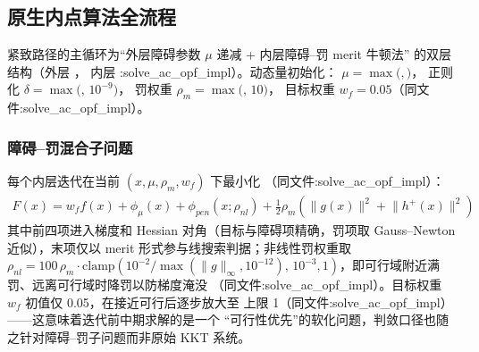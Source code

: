 \subsection{原生内点算法全流程}\label{subsec:acopfnative:algorithm}

紧致路径的主循环为``外层障碍参数 $\mu$ 递减 + 内层障碍--罚 merit 牛顿法''
的双层结构（外层 ，
内层 :solve\_ac\_opf\_impl）。动态量初始化：
$\mu=\max($$,$$)$，
正则化 $\delta=\max($$,\,10^{-9})$，
罚权重 $\rho_{m}=\max($$,\,10)$，
目标权重 $w_f=0.05$（同文件:solve\_ac\_opf\_impl）。

\subsubsection*{障碍--罚混合子问题}
每个内层迭代在当前 $(x,\mu,\rho_m,w_f)$ 下最小化
（同文件:solve\_ac\_opf\_impl）：
\begin{align*}
F(x) = w_f f(x) + \phi_{\mu}(x) + \phi_{pen}(x;\rho_{nl})
       + \tfrac{1}{2}\rho_m\left(\lVert g(x)\rVert^{2}+\lVert h^{+}(x)\rVert^{2}\right)
\end{align*}
其中前四项进入梯度和 Hessian 对角（目标与障碍项精确，罚项取
Gauss--Newton 近似），末项仅以 merit 形式参与线搜索判据；非线性罚权重取
$\rho_{nl}=100\,\rho_m\cdot\mathrm{clamp}(10^{-2}/\max(\lVert g\rVert_{\infty},
10^{-12}),\,10^{-3},1)$，即可行域附近满罚、远离可行域时降罚以防梯度淹没
（同文件:solve\_ac\_opf\_impl）。目标权重 $w_f$ 初值仅 0.05，在接近可行后逐步放大至
上限 1（同文件:solve\_ac\_opf\_impl）——这意味着迭代前中期求解的是一个
``可行性优先''的软化问题，判敛口径也随之针对障碍--罚子问题而非原始 KKT 系统。

